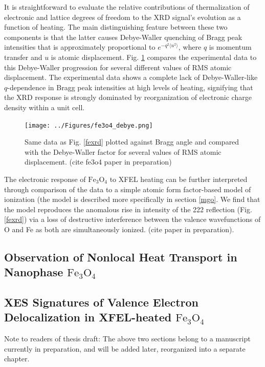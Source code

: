 \documentclass [11pt, proquest, article] {uwthesis}[2016/11/22]
\begin{document}
It is straightforward to evaluate the relative contributions of thermalization of electronic and lattice degrees of freedom to the XRD signal's evolution as a function of heating. The main distinguishing feature between these two components is that the latter causes Debye-Waller quenching of Bragg peak intensities that is approximately proportional to $e^{-q^2\langle u^2 \rangle}$, where $q$ is momentum transfer and $u$ is atomic displacement. Fig. \ref{debye} compares the experimental data to this Debye-Waller progression for several different values of RMS atomic displacement. The experimental data shows a complete lack of Debye-Waller-like $q$-dependence in Bragg peak intensities at high levels of heating, signifying that the XRD response is strongly dominated by reorganization of electronic charge density within a unit cell. 

\begin{figure}[h] 
\caption{Same data as Fig. \ref{fexrd} plotted against Bragg angle and compared with the Debye-Waller factor for several values of RMS atomic displacement. (cite fe3o4 paper in preparation)}
\label{debye}
\centering
\texttt{[image: ../Figures/fe3o4\_debye.png]}
\end{figure}

The electronic response of $\mathrm{Fe}_3\mathrm{O}_4$ to XFEL heating can be further interpreted through comparison of the data to a simple atomic form factor-based model of ionization (the model is described more specifically in section \ref{mgo}. We find that the model reproduces the anomalous rise in intensity of the 222 reflection (Fig. \ref{fexrd}) via a loss of destructive interference between the valence wavefunctions of O and Fe as both are simultaneously ionized. (cite paper in preparation).

\subsection{Observation of Nonlocal Heat Transport in Nanophase $\mathrm{Fe}_3\mathrm{O}_4$}
\subsection{XES Signatures of Valence Electron Delocalization in XFEL-heated $\mathrm{Fe}_3\mathrm{O}_4$}

Note to readers of thesis draft: The above two sections belong to a manuscript currently in preparation, and will be added later, reorganized into a separate chapter.
\end{document}
